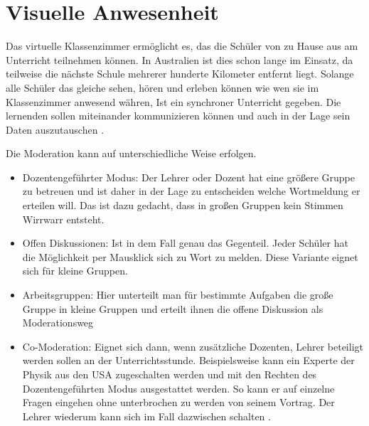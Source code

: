 \section{Visuelle Anwesenheit}
Das virtuelle Klassenzimmer ermöglicht es, das die Schüler von zu Hause aus am Unterricht teilnehmen können. In Australien ist dies schon lange im Einsatz, da teilweise die nächste Schule mehrerer hunderte Kilometer entfernt liegt. Solange alle Schüler das gleiche sehen, hören und erleben können wie wen sie im Klassenzimmer anwesend währen, Ist ein synchroner Unterricht gegeben. Die lernenden sollen miteinander kommunizieren können und auch in der Lage sein Daten auszutauschen \cite[vgl.][]{mikogo.2010}. \pagebreak

\noindent Die Moderation kann auf unterschiedliche Weise erfolgen. 

	\begin{itemize}
		\item Dozentengeführter Modus: Der Lehrer oder Dozent hat eine größere Gruppe zu betreuen und ist daher in der Lage zu entscheiden welche Wortmeldung er erteilen will. Das ist dazu gedacht, dass in großen Gruppen kein Stimmen Wirrwarr entsteht. 
		\item Offen Diskussionen: Ist in dem Fall genau das Gegenteil. Jeder Schüler hat die Möglichkeit per Mausklick sich zu Wort zu melden. Diese Variante eignet sich für kleine Gruppen.
		\item Arbeitsgruppen: Hier unterteilt man für bestimmte Aufgaben die große Gruppe in kleine Gruppen und erteilt ihnen die offene Diskussion als Moderationsweg
		\item Co-Moderation: Eignet sich dann, wenn zusätzliche Dozenten, Lehrer beteiligt werden sollen an der Unterrichtsstunde. Beispielsweise kann ein Experte der Physik aus den USA zugeschalten werden und mit den Rechten des Dozentengeführten Modus ausgestattet werden. So kann er auf einzelne Fragen eingehen ohne unterbrochen zu werden von seinem Vortrag. Der Lehrer wiederum kann sich im Fall dazwischen schalten \cite[vgl.][]{managementcircle.de.2017}.
	\end{itemize}

